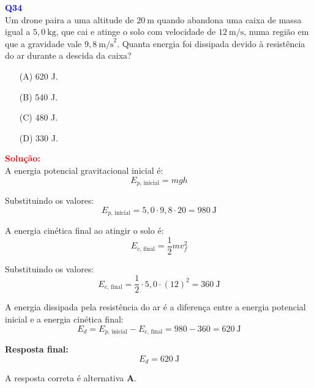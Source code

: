 \documentclass[a4paper,12pt]{article}
\begin{document}
\begin{flushleft}

\textbf{\textcolor{blue}{\Large Q34}}\\
\noindent
Um drone paira a uma altitude de \(20~\mathrm{m}\) quando abandona
uma caixa de massa igual a \(5,0~\mathrm{kg}\), que cai e atinge o solo
com velocidade de \(12~\mathrm{m/s}\), numa região em que a gravidade
vale \(9,8~\mathrm{m/s}^2\). Quanta energia foi dissipada devido à
resistência do ar durante a descida da caixa?

\begin{itemize}
\item[(A)] 620 J.
\item[(B)] 540 J.
\item[(C)] 480 J.
\item[(D)] 330 J.
\end{itemize}

\vspace{0.5cm}

\textcolor{red}{\textbf{Solução:}}\\

A energia potencial gravitacional inicial é:
\begin{equation*}
E_{p,\,\text{inicial}} = m g h
\end{equation*}

Substituindo os valores:
\begin{equation*}
E_{p,\,\text{inicial}} = 5,0 \cdot 9,8 \cdot 20 = 980~\mathrm{J}
\end{equation*}

A energia cinética final ao atingir o solo é:
\begin{equation*}
E_{c,\,\text{final}} = \frac{1}{2} m v_f^2
\end{equation*}

Substituindo os valores:
\begin{equation*}
E_{c,\,\text{final}} = \frac{1}{2} \cdot 5,0 \cdot (12)^2 = 360~\mathrm{J}
\end{equation*}

A energia dissipada pela resistência do ar é a diferença entre a energia potencial inicial e a energia cinética final:
\begin{equation*}
E_d = E_{p,\,\text{inicial}} - E_{c,\,\text{final}} = 980 - 360 = 620~\mathrm{J}
\end{equation*}

\textbf{Resposta final:}
\begin{equation*}
\boxed{E_d = 620~\mathrm{J}}
\end{equation*}

A resposta correta é alternativa \colorbox{green!50}{\textbf{A}}.

\end{flushleft}
\end{document}
